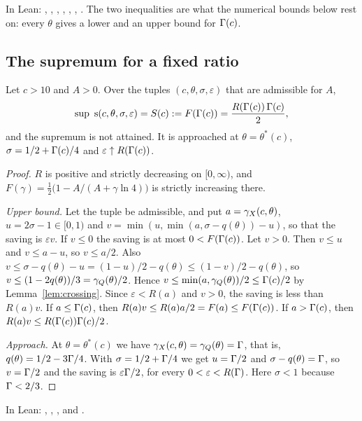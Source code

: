 In Lean: , ,
, , , ,
.  The two inequalities are what the numerical bounds
below rest on: every \(\theta\) gives a lower and an upper bound for
\(\Gamma(c)\).

\subsection{The supremum for a fixed ratio}

\begin{theorem}\label{thm:sup}
Let \(c>10\) and \(A>0\).  Over the tuples \((c,\theta,\sigma,\varepsilon)\)
that are admissible for \(A\),
\[
  \sup\ \sav(c,\theta,\sigma,\varepsilon)=S(c):=F(\Gam(c))=\frac{R(\Gam(c))\,\Gam(c)}{2},
\]
and the supremum is not attained.  It is approached at
\(\theta=\theta^{*}(c)\), \(\sigma=1/2+\Gamma(c)/4\) and
\(\varepsilon\uparrow R(\Gamma(c))\).
\end{theorem}

\begin{proof}
\(R\) is positive and strictly decreasing on \([0,\infty)\), and
\(F(\gamma)=\frac12\bigl(1-A/(A+\gamma\ln 4)\bigr)\) is strictly increasing
there.

\emph{Upper bound.}  Let the tuple be admissible, and put
\(a=\gamma_{X}(c,\theta)\), \(u=2\sigma-1\in[0,1)\) and
\(v=\min(u,\min(a,\sigma-q(\theta))-u)\), so that the saving is
\(\varepsilon v\).  If \(v\le0\) the saving is at most \(0<F(\Gamma(c))\).  Let
\(v>0\).  Then \(v\le u\) and \(v\le a-u\), so \(v\le a/2\).  Also
\(v\le\sigma-q(\theta)-u=(1-u)/2-q(\theta)\le(1-v)/2-q(\theta)\), so
\(v\le(1-2q(\theta))/3=\gamma_{Q}(\theta)/2\).  Hence
\(v\le\min(a,\gamma_{Q}(\theta))/2\le\Gamma(c)/2\) by Lemma~\ref{lem:crossing}.  Since
\(\varepsilon<R(a)\) and \(v>0\), the saving is less than \(R(a)v\).  If
\(a\le\Gamma(c)\), then \(R(a)v\le R(a)a/2=F(a)\le F(\Gamma(c))\).  If
\(a>\Gamma(c)\), then \(R(a)v\le R(\Gamma(c))\Gamma(c)/2\).

\emph{Approach.}  At \(\theta=\theta^{*}(c)\) we have
\(\gamma_{X}(c,\theta)=\gamma_{Q}(\theta)=\Gamma\), that is, \(q(\theta)=1/2-3\Gamma/4\).  With
\(\sigma=1/2+\Gamma/4\) we get \(u=\Gamma/2\) and \(\sigma-q(\theta)=\Gamma\), so
\(v=\Gamma/2\) and the saving is \(\varepsilon\Gamma/2\), for every
\(0<\varepsilon<R(\Gamma)\).  Here \(\sigma<1\) because \(\Gamma<2/3\).
\end{proof}

In Lean: , ,
,  and
.

